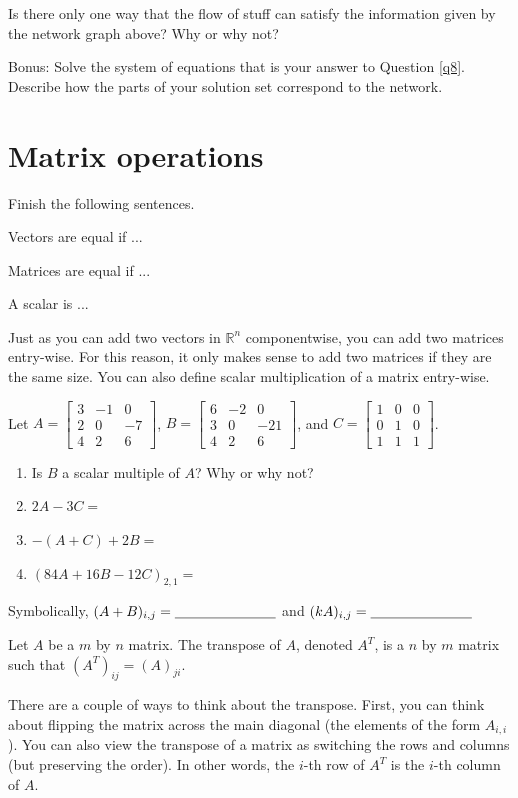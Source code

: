 \bq Is there only one way that the flow of stuff can satisfy the information given by the network graph above? Why or why not?
\eq

\bq Bonus: Solve the system of equations that is your answer to Question \ref{q8}. Describe how the parts of your solution set correspond to the network.
\eq

\section{Matrix operations}\label{mo}
\bq Finish the following sentences.
\be
\item Vectors are equal if ...
\item Matrices are equal if ...
\item A scalar is ...
\ee
\eq

Just as you can add two vectors in $\mathbb{R}^n$ componentwise, you can add two matrices entry-wise. For this reason, it only makes sense to add two matrices if they are the same size. You can also define scalar multiplication of a matrix entry-wise.
\begin{annotation}
\end{annotation}

\bq Let $A=\begin{bmatrix} 3&-1&0 \\2&0&-7 \\ 4&2&6 \end{bmatrix}$, $B=\begin{bmatrix} 6&-2&0 \\3&0&-21 \\ 4&2&6 \end{bmatrix}$, and \break$C=\begin{bmatrix} 1&0&0 \\0&1&0\\1&1&1 \end{bmatrix}$.
\begin{enumerate}
\item Is $B$ a scalar multiple of $A$? Why or why not?
\item $2A-3C=$
\item $-(A+C)+2B=$
\item $(84A+16B-12C)_{2,1}=$
\end{enumerate}
\eq
\bq Symbolically, $(A+B)_{i,j}=\underline{\hspace{1.0in}}$ and \break$(k A)_{i,j}=\underline{\hspace{1.0in}}$
\eq
\begin{definition}
Let $A$ be a $m$ by $n$ matrix. The transpose of $A$, denoted $A^T$, is a $n$ by $m$ matrix such that $(A^T)_{ij}= (A)_{ji}$.
\end{definition}
There are a couple of ways to think about the transpose. First, you can think about flipping the matrix across the main diagonal (the elements of the form $A_{i,i}$). You can also view the transpose of a matrix as switching the rows and columns (but preserving the order). In other words, the $i$-th row of $A^T$ is the $i$-th column of $A$.

